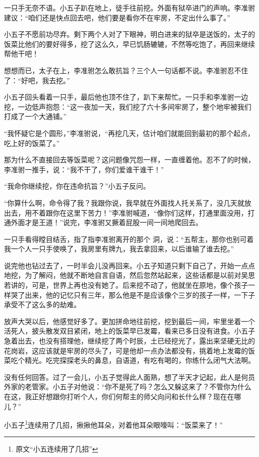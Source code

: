 一只手无奈不语。小五子趴在地上，徒手往前挖。外面有狱卒进门的声响。李准驸建议：“咱们还是快点回去吧，他们要是看你不在牢房，不定出什么事了。”

小五子不愿前功尽弃。剩下两个人对了下眼神，明白进来的狱卒是送饭的，太子的饭菜比他们的要好得多，挖了这么久，早已饥肠辘辘，不然等吃饱了，再回来继续帮他干吧！

想想而已，太子在上，李准驸怎么敢抗旨？三个人一句话都不说。李准驸忍不住了：“好吧，我去挖。”

小五子回头看着一只手，最后他也顶不住了，趴下来帮忙。一只手和李准驸一边挖，一边低声抱怨：“这一夜加一天，我们挖了六十多间牢房了，整个地牢被我们打成了一个大通铺。”

“我怀疑它是个圆形，”李准驸说，“再挖几天，估计咱们就能回到最初的那个起点，吃上好的饭菜了。”

那为什么不直接回去等饭菜呢？这问题像咒怨一样，一直缠着他。忍不了的时候，李准驸一推手，说：“我不干了，你们爱谁干谁干！”

“我命你继续挖，你在违命抗旨？”小五子反问。

“你算什么啊，命令得了我？我跟你说，我早就在外面找人托关系了，没几天就放出去，用不着跟你在这里下苦力！”李准驸喊道，“像你们这样，打通里面没用，打通外面才是王道！”说完，李准驸又撅着屁股一间一间地爬回去。

一只手看得瞠目结舌，指了指李准驸离开的那个
洞，说：“五帮主，那你也别可着我一个人一只手使唤了，我房里有牌九，我去拿回来，以后谁输了谁去挖。”

说完他也钻过去了，一时半会儿没再回来。小五子知道只剩下自己了，开始一点点地挖，为了解闷，他就不断地自言自语，然后忽然站起来，这些话都是以前对吴思若讲的，可是，世界上再也没有她了。后来挖不动了，他就坐在原地，像个孩子一样哭了出来，他的记忆只有三年，那么他是不是应该像个三岁的孩子一样，一下子承受不了这么多的劫难。

放声大哭以后，他感觉好多了。更加拼命地往前挖，挖到最后一间，牢里坐着一个活死人，披头散发双目紧闭，地上的饭菜早已发霉，看来已多日没有进食。小五子急着出去，也没有搭理他，继续挖了两个时辰，土已经挖光了，露出来坚硬无比的花岗岩，这应该就是牢房的尽头了，可是他却一点办法都没有，挑着地上发霉的饭菜吃个精光。吃完探探老头的鼻息，自语道，有吃有喝的，你练什么闭气大法啊。

没有任何回答。过了一会儿，小五子觉得此人面熟，想了半天才记起，此人是何员外家的老管家。小五子对他说：“你不是死了吗？怎么又躲这来了？不管你为什么在这，我正好想跟你打听个人，你们何帮主的师父向问和长什么样？现在在哪儿？”

小五子\footnote{原文“小五连续用了几招”}连续用了几招，揪揪他耳朵，对着他耳朵眼嚎叫：“饭菜来了！”

